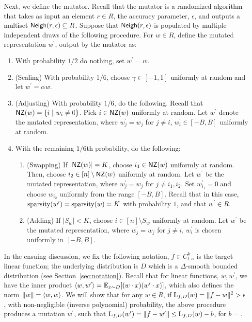 Next, we define the mutator. Recall that the mutator is a randomized algorithm
that takes as input an element $r \in R$, the accuracy parameter, $\epsilon$,
and outputs a multiset $\mathsf{Neigh}(r, \epsilon) \subseteq R$. Suppose that
$\mathsf{Neigh}(r, \epsilon)$ is populated by multiple independent draws of the
following procedure.  For $w \in R$, define the mutated representation
$w^\prime$, output by the mutator as:
\begin{enumerate}
%
\item With probability $1/2$ do nothing, set $w^\prime = w$.
%
\item (Scaling) With probability $1/6$, choose $\gamma \in [-1, 1]$ uniformly at
random and let $w^\prime = \alpha w$. 
%
\item (Adjusting) With probability $1/6$, do the following. Recall that $\mathsf{NZ}(w)
= \{ i~|~ w_i \neq 0 \}$. Pick $i \in \mathsf{NZ}(w)$ uniformly at random. Let
$w^\prime$ denote the mutated representation, where $w^\prime_j = w_j$ for $j
\neq i$, $w^\prime_i \in [-B, B]$ uniformly at random. 
%
\item With the remaining $1/6$th probability, do the following:
\begin{enumerate}
\item (Swapping) If $|\mathsf{NZ}(w)| = K$, choose $i_1 \in \mathsf{NZ}(w)$ uniformly at random.
Then, choose $i_2 \in [n] \setminus \mathsf{NZ}(w)$ uniformly at random. Let $w^\prime$
be the mutated representation, where $w_j^\prime = w_j$ for $j \neq i_1, i_2$.
Set $w_{i_1}^\prime = 0$ and choose $w_{i_2}^\prime$ uniformly from the range
$[-B, B]$. Recall that in this case, $\mathrm{sparsity}(w^\prime) = \mathrm{sparsity}(w) = K$
with probability $1$, and that $w^\prime \in R$.
\item (Adding) If $|S_w| < K$, choose $i \in [n] \setminus S_w$ uniformly at random. Let
$w^\prime$ be the mutated representation, where $w_j^\prime = w_j$ for $j \neq
i$, $w^\prime_i$ is chosen uniformly in $[-B, B]$. 
\end{enumerate}
\end{enumerate}

In the ensuing discussion, we fix the following notation, $f \in C^k_{l, u}$ is
the target linear function; the underlying distribution is $D$ which is a
$\Delta$-smooth bounded distribution (see Section~\ref{sec:notation}). Recall
that for linear functions, $w, w^\prime$, we have the inner product
$\langle w, w^\prime \rangle = \mathbb{E}_{x \sim D}[(w \cdot x) (w^\prime \cdot x)]$, which also
defines the norm $\Vert w \Vert = \langle w, w \rangle$.  We will show that for any $w \in
R$, if $\mathrm{L}_{f, D}(w) = \Vert f - w \Vert^2 > \epsilon$, with non-negligible
(inverse polynomial) probability, the above procedure produces a mutation
$w^\prime$, such that $\mathrm{L}_{f, D}(w^\prime) = \Vert f - w^\prime \Vert \leq
\mathrm{L}_{f, D}(w) - b$, for $b = $.

